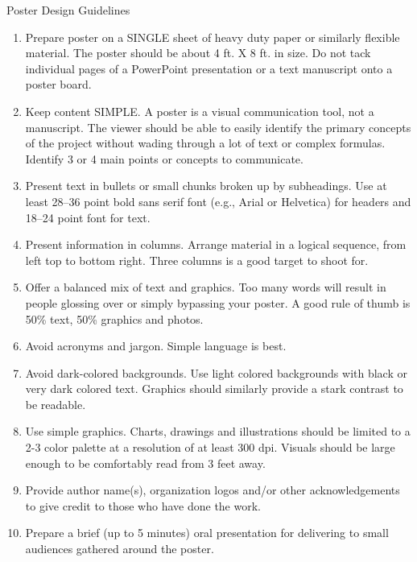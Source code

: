 \documentclass[final]{beamer}
\newlength{\colwidth}
\begin{document}
\begin{frame}[t]
\begin{columns}[t]
\begin{column}{\colwidth}
\begin{block}{Poster Design Guidelines}
    \begin{enumerate}
        \item Prepare poster on a SINGLE sheet of heavy duty paper or similarly flexible material. The poster should be about 4 ft. X 8 ft. in size. Do not tack individual pages of a PowerPoint presentation or a text manuscript onto a poster
board.
\item Keep content SIMPLE. A poster is a visual communication tool, not a manuscript. The viewer should be able to easily identify the primary concepts of the project without wading through a lot of text or complex formulas. Identify 3 or 4 main points or concepts to communicate.
\item Present text in bullets or small chunks broken up by subheadings. Use at least 28–36 point bold sans serif font (e.g., Arial or Helvetica) for headers and 18–24 point font for text.
\item Present information in columns. Arrange material in a logical sequence, from left top to bottom right. Three columns is a good target to shoot for.
\item Offer a balanced mix of text and graphics. Too many words will result in people glossing over or simply bypassing your poster. A good rule of thumb is 50\% text, 50\% graphics and photos.
\item Avoid acronyms and jargon. Simple language is best.
\item Avoid dark-colored backgrounds. Use light colored backgrounds with black or very dark colored text. Graphics should similarly provide a stark contrast to be readable.
\item Use simple graphics. Charts, drawings and illustrations should be limited to a 2-3 color palette at a resolution of at least 300 dpi. Visuals should be large enough to be comfortably read from 3 feet away.
\item Provide author name(s), organization logos and/or other acknowledgements to give credit to those who have done the work.
\item Prepare a brief (up to 5 minutes) oral presentation for delivering to small audiences gathered around the poster.
    \end{enumerate}
\end{block}





\end{column}


\end{columns}
\end{frame}
\end{document}
